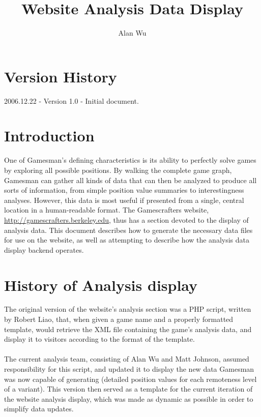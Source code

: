 \documentclass[11pt]{article}
\newcommand{\gchref}[2]{\textcolor{blue}{\underline{\href{#1}{#2}}}}
\begin{document}
\title{Website Analysis Data Display}
\author{Alan Wu}
\date{}
\maketitle

\section*{Version History}
2006.12.22 - Version 1.0 - Initial document.

\newpage
\tableofcontents
\newpage

\section{Introduction}
One of Gamesman's defining characteristics is its ability to perfectly solve games by exploring all possible positions. By walking the complete game graph, Gamesman can gather all kinds of data that can then be analyzed to produce all sorts of information, from simple position value summaries to interestingness analyses. However, this data is most useful if presented from a single, central location in a human-readable format. The Gamescrafters website, \gchref{http://gamescrafters.berkeley.edu}{http://gamescrafters.berkeley.edu}, thus has a section devoted to the display of analysis data. This document describes how to generate the necessary data files for use on the website, as well as attempting to describe how the analysis data display backend operates.

\section{History of Analysis display}
The original version of the website's analysis section was a PHP script, written by Robert Liao, that, when given a game name and a properly formatted template, would retrieve the XML file containing the game's analysis data, and display it to visitors according to the format of the template.
\\\\The current analysis team, consisting of Alan Wu and Matt Johnson, assumed responsibility for this script, and updated it to display the new data Gamesman was now capable of generating (detailed position values for each remoteness level of a variant). This version then served as a template for the current iteration of the website analysis display, which was made as dynamic as possible in order to simplify data updates.
\end{document}
